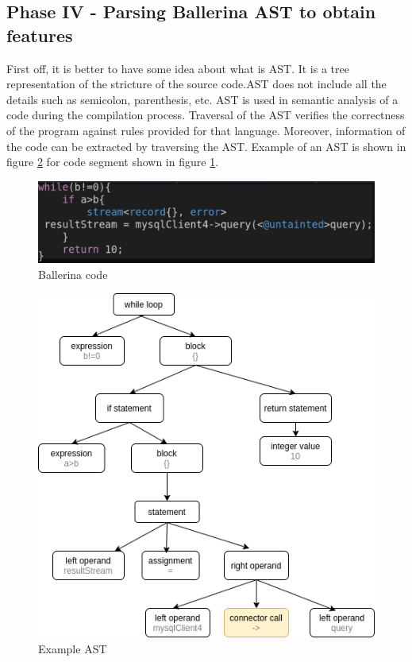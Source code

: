 \subsection{Phase IV - Parsing Ballerina AST to obtain features}\label{phase_iv}

First off, it is better to have some idea about what is \acrfull{AST}. It is a tree representation of the stricture of the source code.AST does not include all the details such as semicolon, parenthesis, etc. AST is used in semantic analysis of a code during the compilation process. Traversal of the AST verifies the correctness of the program against rules provided for that language. Moreover, information of the code can be extracted by traversing the AST.  Example of an AST is shown in figure \ref{AST_example} for code segment shown in figure \ref{code_for_ast}.

\begin{figure}[htbp]
	\begin{center}
		\includegraphics[scale=0.3]{figures/sample_code_for_ast.png}
	\end{center}
	\caption{Ballerina code}
	\label{code_for_ast}
\end{figure}

\begin{figure}[htbp]
	\begin{center}
		\includegraphics[scale=0.5]{figures/AST example.png}
	\end{center}
	\caption{Example AST}
	\label{AST_example}
\end{figure}

